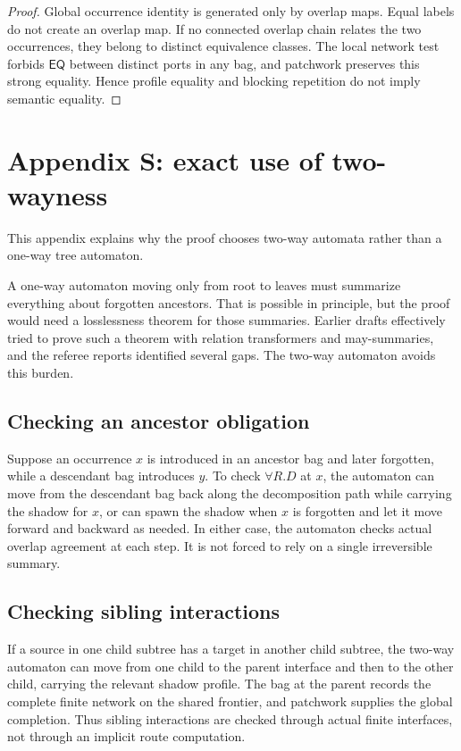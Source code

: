 \documentclass[11pt]{article}
\newcommand{\EQ}{\mathsf{EQ}}
\begin{document}
\begin{proof}
Global occurrence identity is generated only by overlap maps.  Equal labels do not create an overlap map.  If no connected overlap chain relates the two occurrences, they belong to distinct equivalence classes.  The local network test forbids $\EQ$ between distinct ports in any bag, and patchwork preserves this strong equality.  Hence profile equality and blocking repetition do not imply semantic equality.
\end{proof}

\section{Appendix S: exact use of two-wayness}

This appendix explains why the proof chooses two-way automata rather than a one-way tree automaton.

A one-way automaton moving only from root to leaves must summarize everything about forgotten ancestors.  That is possible in principle, but the proof would need a losslessness theorem for those summaries.  Earlier drafts effectively tried to prove such a theorem with relation transformers and may-summaries, and the referee reports identified several gaps.  The two-way automaton avoids this burden.

\subsection{Checking an ancestor obligation}

Suppose an occurrence $x$ is introduced in an ancestor bag and later forgotten, while a descendant bag introduces $y$.  To check $\forall R.D$ at $x$, the automaton can move from the descendant bag back along the decomposition path while carrying the shadow for $x$, or can spawn the shadow when $x$ is forgotten and let it move forward and backward as needed.  In either case, the automaton checks actual overlap agreement at each step.  It is not forced to rely on a single irreversible summary.

\subsection{Checking sibling interactions}

If a source in one child subtree has a target in another child subtree, the two-way automaton can move from one child to the parent interface and then to the other child, carrying the relevant shadow profile.  The bag at the parent records the complete finite network on the shared frontier, and patchwork supplies the global completion.  Thus sibling interactions are checked through actual finite interfaces, not through an implicit route computation.
\end{document}
